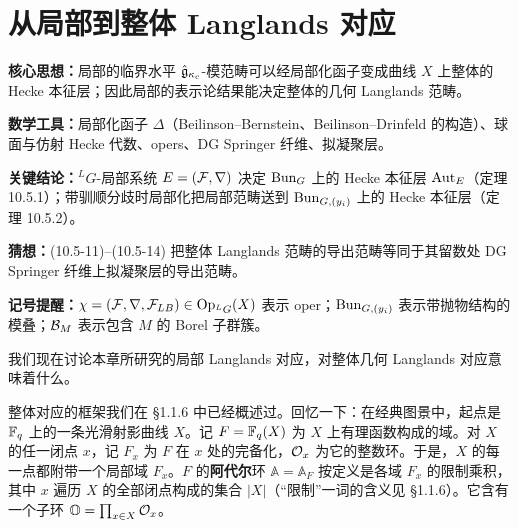 
\section{从局部到整体 Langlands 对应}

\begin{keypoints}
    \item \textbf{核心思想：}局部的临界水平 $\hat{\mathfrak{g}}_{\kappa_c}$-模范畴可以经局部化函子变成曲线 $X$ 上整体的 Hecke 本征层；因此局部的表示论结果能决定整体的几何 Langlands 范畴。
    \item \textbf{数学工具：}局部化函子 $\Delta$（Beilinson--Bernstein、Beilinson--Drinfeld 的构造）、球面与仿射 Hecke 代数、opers、DG Springer 纤维、拟凝聚层。
    \item \textbf{关键结论：}$^L G$-局部系统 $E=(\mathcal{F},\nabla)$ 决定 $\operatorname{Bun}_G$ 上的 Hecke 本征层 $\operatorname{Aut}_E$（定理 10.5.1）；带驯顺分歧时局部化把局部范畴送到 $\operatorname{Bun}_{G,(y_i)}$ 上的 Hecke 本征层（定理 10.5.2）。
    \item \textbf{猜想：}(10.5-11)--(10.5-14) 把整体 Langlands 范畴的导出范畴等同于其留数处 DG Springer 纤维上拟凝聚层的导出范畴。
    \item \textbf{记号提醒：}$\chi=(\mathcal{F},\nabla,\mathcal{F}_{LB})\in\operatorname{Op}_{{}^L G}(X)$ 表示 oper；$\operatorname{Bun}_{G,(y_i)}$ 表示带抛物结构的模叠；$\mathcal{B}_M$ 表示包含 $M$ 的 Borel 子群簇。
\end{keypoints}

我们现在讨论本章所研究的局部 Langlands 对应，对整体几何 Langlands 对应意味着什么。

整体对应的框架我们在 §1.1.6 中已经概述过。回忆一下：在经典图景中，起点是 $\mathbb{F}_q$ 上的一条光滑射影曲线 $X$。记 $F=\mathbb{F}_q(X)$ 为 $X$ 上有理函数构成的域。对 $X$ 的任一闭点 $x$，记 $F_x$ 为 $F$ 在 $x$ 处的完备化，$\mathcal{O}_x$ 为它的整数环。于是，$X$ 的每一点都附带一个局部域 $F_x$。$F$ 的\textbf{阿代尔}环 $\mathbb{A}=\mathbb{A}_F$ 按定义是各域 $F_x$ 的限制乘积，其中 $x$ 遍历 $X$ 的全部闭点构成的集合 $|X|$（“限制”一词的含义见 §1.1.6）。它含有一个子环 $\mathbb{O}=\prod_{x\in X}\mathcal{O}_x$。

